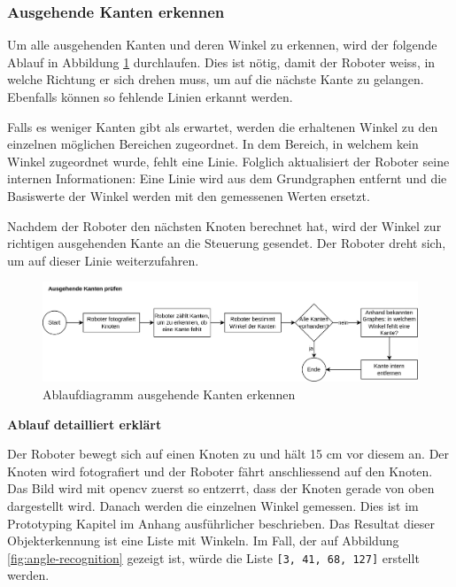 \subsubsection{Ausgehende Kanten erkennen}\label{outgoing-angles}

Um alle ausgehenden Kanten und deren Winkel zu erkennen, wird der folgende Ablauf in Abbildung \ref{fig:ablaufdiagramm-kanten-erkennen} durchlaufen. Dies ist nötig, damit der Roboter weiss, in welche Richtung er sich drehen muss, um auf die nächste Kante zu gelangen. Ebenfalls können so fehlende Linien erkannt werden.

Falls es weniger Kanten gibt als erwartet, werden die erhaltenen Winkel zu den einzelnen möglichen Bereichen zugeordnet. In dem Bereich, in welchem kein Winkel zugeordnet wurde, fehlt eine Linie. Folglich aktualisiert der Roboter seine internen Informationen: Eine Linie wird aus dem Grundgraphen entfernt und die Basiswerte der Winkel werden mit den gemessenen Werten ersetzt.

Nachdem der Roboter den nächsten Knoten berechnet hat, wird der Winkel zur richtigen ausgehenden Kante an die Steuerung gesendet. Der Roboter dreht sich, um auf dieser Linie weiterzufahren.

\begin{figure}[H]
\centering
\includegraphics[width=\textwidth]{assets/gesamtkonzept/ablaufdiagramm-kanten-erkennen.png}
\caption{Ablaufdiagramm ausgehende Kanten erkennen}
\label{fig:ablaufdiagramm-kanten-erkennen}
\end{figure}

\textbf{Ablauf detailliert erklärt}

Der Roboter bewegt sich auf einen Knoten zu und hält 15 cm vor diesem an. Der Knoten wird fotografiert und der Roboter fährt anschliessend auf den Knoten. Das Bild wird mit \gls{opencv} zuerst so entzerrt, dass der Knoten gerade von oben dargestellt wird. Danach werden die einzelnen Winkel gemessen. Dies ist im Prototyping Kapitel im Anhang  ausführlicher beschrieben. Das Resultat dieser Objekterkennung ist eine Liste mit Winkeln. Im Fall, der auf Abbildung \ref{fig:angle-recognition} gezeigt ist, würde die Liste \verb|[3, 41, 68, 127]| erstellt werden.

